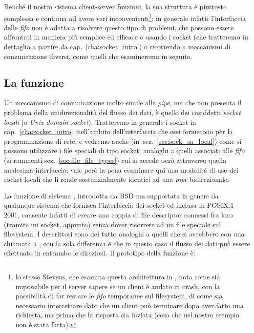 Benché il nostro sistema client-server funzioni, la sua struttura è piuttosto
complessa e continua ad avere vari inconvenienti\footnote{lo stesso Stevens,
  che esamina questa architettura in \cite{APUE}, nota come sia impossibile
  per il server sapere se un client è andato in crash, con la possibilità di
  far restare le \textit{fifo} temporanee sul filesystem, di come sia
  necessario intercettare  dato che un client può terminare
  dopo aver fatto una richiesta, ma prima che la risposta sia inviata (cosa
  che nel nostro esempio non è stata fatta).}; in generale infatti
l'interfaccia delle \textit{fifo} non è adatta a risolvere questo tipo di
problemi, che possono essere affrontati in maniera più semplice ed efficace o
usando i socket (che tratteremo in dettaglio a partire da
cap.~\ref{cha:socket_intro}) o ricorrendo a meccanismi di comunicazione
diversi, come quelli che esamineremo in seguito.



\subsection{La funzione }
\label{sec:ipc_socketpair}

Un meccanismo di comunicazione molto simile alle \textit{pipe}, ma che non
presenta il problema della unidirezionalità del flusso dei dati, è quello dei
cosiddetti \textsl{socket locali} (o \textit{Unix domain socket}).  Tratteremo
in generale i socket in cap.~\ref{cha:socket_intro}, nell'ambito
dell'interfaccia che essi forniscono per la programmazione di rete, e vedremo
anche (in~sez.~\ref{sec:sock_sa_local}) come si possono utilizzare i file
speciali di tipo socket, analoghi a quelli associati alle \textit{fifo} (si
rammenti sez.~\ref{sec:file_file_types}) cui si accede però attraverso quella
medesima interfaccia; vale però la pena esaminare qui una modalità di uso dei
socket locali che li rende sostanzialmente identici ad una \textit{pipe}
bidirezionale.

La funzione di sistema , introdotta da BSD ma supportata in
genere da qualunque sistema che fornisca l'interfaccia dei socket ed inclusa
in POSIX.1-2001, consente infatti di creare una coppia di file descriptor
connessi fra loro (tramite un socket, appunto) senza dover ricorrere ad un
file speciale sul filesystem. I descrittori sono del tutto analoghi a quelli
che si avrebbero con una chiamata a , con la sola differenza è che
in questo caso il flusso dei dati può essere effettuato in entrambe le
direzioni. Il prototipo della funzione è:

